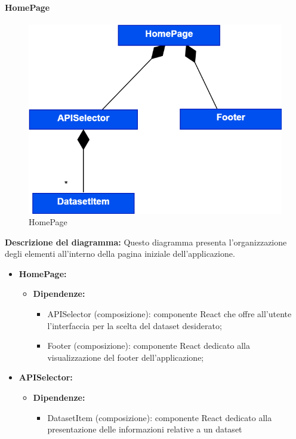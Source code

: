 \paragraph{HomePage}
\begin{figure}[h!] \centering
      \includegraphics[scale=0.3]{template/images/uml_front/ui/HomePage.png}
      \caption{HomePage}
\end{figure}
\textbf{Descrizione del diagramma:}
Questo diagramma presenta l'organizzazione degli elementi all'interno della pagina iniziale dell'applicazione.
\begin{itemize}
      \item \textbf{HomePage:}
            \begin{itemize}
                  \item \textbf{Dipendenze:}
                        \begin{itemize}
                              \item APISelector (composizione): componente React che offre all'utente l'interfaccia
                                    per la scelta del dataset desiderato;
                              \item Footer (composizione): componente React dedicato alla visualizzazione del
                                    footer dell'applicazione;
                        \end{itemize}
            \end{itemize}

      \item \textbf{APISelector:}
            \begin{itemize}
                  \item \textbf{Dipendenze:}
                        \begin{itemize}
                              \item DatasetItem (composizione): componente React dedicato alla presentazione delle
                                    informazioni relative a un dataset
                        \end{itemize}
            \end{itemize}
\end{itemize}

